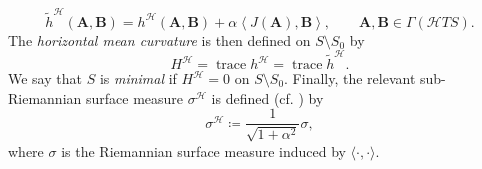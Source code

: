 \documentclass[11pt]{amsart}
\newcommand{\hhh}{{\mathcal{H}}}
\newcommand{\vh}{\nu}
\newcommand{\eps}{\varepsilon}
\newcommand{\E}{\mathrm{F}}
\newcommand{\A}{\mathbf{A}}
\newcommand{\B}{\mathbf{B}}
\DeclareMathOperator{\divv}{div}
\DeclareMathOperator{\trace}{trace}
\theoremstyle{definition}
\theoremstyle{remark}
\numberwithin{equation}{section}
\begin{document}
\begin{equation*}\label{rapptrahetildacca2026}
    \tilde h^\hhh(\A,\B)=h^\hhh(\A,\B)+\alpha\left\langle J(\A),\B\right\rangle,\qquad\A,\B\in\Gamma(\hhh TS).
\end{equation*}
The \emph{horizontal mean curvature} is then defined on $S\setminus S_0$ by
\begin{equation*}
    H^\hhh=\trace h^\hhh=\trace \tilde h^\hhh.
\end{equation*}
We say that $S$ is \emph{minimal} if $H^\hhh=0$ on $S\setminus S_0$. 
Finally, the relevant sub-Riemannian surface measure $\sigma^\hhh$ is defined (cf. \cite{MR2354992, MR2262196}) by
\begin{equation}\label{areaelementorizz}
    \sigma^\hhh\coloneqq \frac{1}{\sqrt{1+\alpha^2}}\sigma,
\end{equation}
where $\sigma$ is the Riemannian surface measure induced by $\langle\cdot,\cdot\rangle$. 
\end{document}
